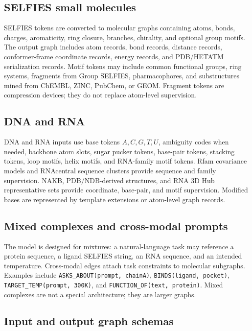 \documentclass[11pt]{article}
\newcommand{\1}{\mathbf{1}}
\begin{document}
\subsection{SELFIES small molecules}

SELFIES tokens are converted to molecular graphs containing atoms, bonds, charges, aromaticity, ring closure, branches, chirality, and optional group motifs. The output graph includes atom records, bond records, distance records, conformer-frame coordinate records, energy records, and PDB/HETATM serialization records. Motif tokens may include common functional groups, ring systems, fragments from Group SELFIES, pharmacophores, and substructures mined from ChEMBL, ZINC, PubChem, or GEOM. Fragment tokens are compression devices; they do not replace atom-level supervision.

\subsection{DNA and RNA}

DNA and RNA inputs use base tokens $A,C,G,T,U$, ambiguity codes when needed, backbone atom slots, sugar pucker tokens, base-pair tokens, stacking tokens, loop motifs, helix motifs, and RNA-family motif tokens. Rfam covariance models and RNAcentral sequence clusters provide sequence and family supervision. NAKB, PDB/NDB-derived structures, and RNA 3D Hub representative sets provide coordinate, base-pair, and motif supervision. Modified bases are represented by template extensions or atom-level graph records.

\subsection{Mixed complexes and cross-modal prompts}

The model is designed for mixtures: a natural-language task may reference a protein sequence, a ligand SELFIES string, an RNA sequence, and an intended temperature. Cross-modal edges attach task constraints to molecular subgraphs. Examples include \texttt{ASKS\_ABOUT(prompt, chainA)}, \texttt{BINDS(ligand, pocket)}, \texttt{TARGET\_TEMP(prompt, 300K)}, and \texttt{FUNCTION\_OF(text, protein)}. Mixed complexes are not a special architecture; they are larger graphs.

\subsection{Input and output graph schemas}
\end{document}
